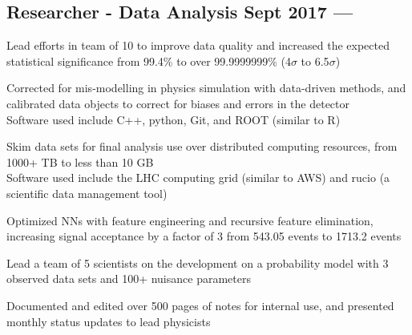 \documentclass[letter,10pt]{article}
\begin{document}
\subsection{{Researcher - Data Analysis  \hfill Sept 2017 --- }}
\begin{zitemize}
\item Lead efforts in team of 10 to improve data quality and increased the expected statistical significance from 99.4\% to over 99.9999999\% (4$\sigma$ to 6.5$\sigma$)
\item Corrected for mis-modelling in physics simulation with data-driven methods, and calibrated data objects to correct for biases and errors in the detector \\
Software used include C++, python, Git, and ROOT (similar to R)
\item Skim data sets for final analysis use over distributed computing resources, from  1000+ TB to less than 10 GB \\
Software used include the LHC computing grid (similar to AWS) and rucio (a scientific data management tool)
\item Optimized NNs with feature engineering and recursive feature elimination, increasing signal acceptance by a factor of 3 from 543.05 events to 1713.2 events
\item Lead a team of 5 scientists on the development on a probability model with 3 observed data sets and 100+ nuisance parameters
\item Documented and edited over 500 pages of notes for internal use, and presented monthly status updates to lead physicists
\end{zitemize}
\end{document}
